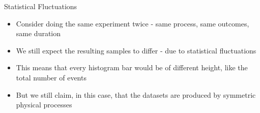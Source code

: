 \documentclass[notheorems]{beamer}
\begin{document}
\begin{frame}{Statistical Fluctuations}
    \begin{itemize}
        \item Consider doing the same experiment twice - same process, same outcomes, same duration
        \item We still expect the resulting samples to differ - due to statistical fluctuations
        \item This means that every histogram bar would be of different height, like the total number of events
        \item But we still claim, in this case, that the datasets are produced by symmetric physical processes
    \end{itemize}
\end{frame}
\end{document}
